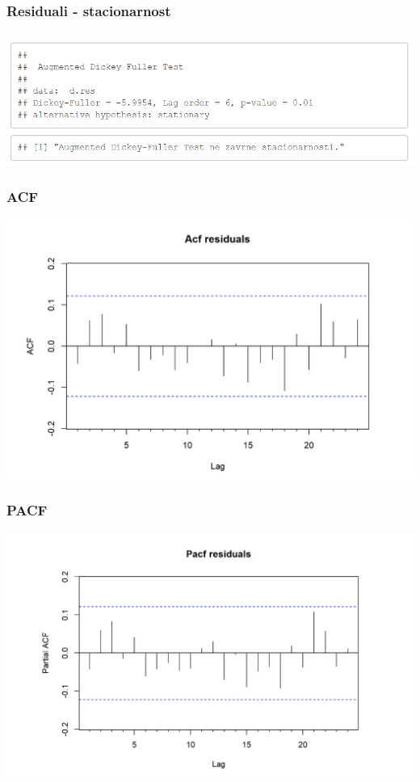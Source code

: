 \documentclass[10pt]{beamer}
\begin{document}
\begin{frame}
\frametitle{Residuali - stacionarnost}
\includegraphics[width=1\textwidth]{stacionarnostB.png}
\end{frame}


\begin{frame}
\frametitle{ACF}
\includegraphics[width=1\textwidth]{AcfB.png}
\end{frame}

\begin{frame}
\frametitle{PACF}
\includegraphics[width=1\textwidth]{PacfB.png}
\end{frame}
\end{document}
